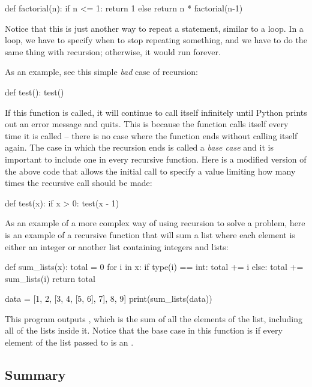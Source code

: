 \documentclass[11pt]{cselabheader}
\begin{document}
\begin{python3code}
def factorial(n):
  if n <= 1:
    return 1
  else
    return n * factorial(n-1)
\end{python3code}

Notice that this is just another way to repeat a statement, similar to a loop.
In a loop, we have to specify when to stop repeating something, and we have to
do the same thing with recursion; otherwise, it would run forever.

As an example, see this simple \emph{bad} case of recursion:

\begin{python3code}
def test():
    test()
\end{python3code}

If this function is called, it will continue to call itself infinitely until
Python prints out an error message and quits. This is because the function calls
itself every time it is called -- there is no case where the function ends
without calling itself again. The case in which the recursion ends is called a
\emph{base case} and it is important to include one in every recursive function.
Here is a modified version of the above code that allows the initial call to
specify a value limiting how many times the recursive call should be made:

\begin{python3code}
def test(x):
    if x > 0:
        test(x - 1)
\end{python3code}

As an example of a more complex way of using recursion to solve a problem, here
is an example of a recursive function that will sum a list where each element is
either an integer or another list containing integers and lists:

\begin{python3code}
def sum_lists(x):
    total = 0
    for i in x:
        if type(i) == int:
            total += i
        else:
            total += sum_lists(i)
    return total

data = [1, 2, [3, 4, [5, 6], 7], 8, 9]
print(sum_lists(data))
\end{python3code}

This program outputs , which is the sum of all the elements of the
list, including all of the lists inside it. Notice that the base case in this
function is if every element of the list passed to  is an
.

\subsection{Summary}
\end{document}
